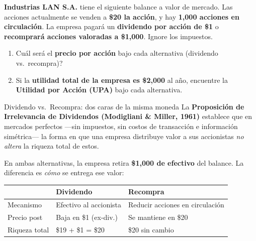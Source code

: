 \documentclass[12pt,a4paper]{article}
\begin{document}
\begin{cajaenunciado}
\textbf{Industrias LAN S.A.} tiene el siguiente balance a valor de mercado.
Las acciones actualmente se venden a \textbf{\$20 la acci\'on}, y hay
\textbf{1{,}000 acciones en circulaci\'on}. La empresa pagar\'a un
\textbf{dividendo por acci\'on de \$1} o \textbf{recomprar\'a acciones
valoradas a \$1{,}000}. Ignore los impuestos.

\begin{enumerate}[label=\alph*.]
\item \textquestiondown Cu\'al ser\'a el \textbf{precio por acci\'on} bajo cada alternativa
      (dividendo vs.\ recompra)?
\item Si la \textbf{utilidad total de la empresa es \$2{,}000} al a\~no, encuentre la
      \textbf{Utilidad por Acci\'on (UPA)} bajo cada alternativa.
\end{enumerate}
\end{cajaenunciado}

\vspace{0.5cm}

\begin{cajaintuicion}{Dividendo vs.\ Recompra: dos caras de la misma moneda}
La \textbf{Proposici\'on de Irrelevancia de Dividendos
(Modigliani \& Miller, 1961)} establece que en mercados perfectos
---sin impuestos, sin costos de transacci\'on e informaci\'on
sim\'etrica--- la forma en que una empresa distribuye valor a sus
accionistas \emph{no altera} la riqueza total de estos.

En ambas alternativas, la empresa retira \textbf{\$1{,}000 de efectivo} del balance.
La diferencia es \emph{c\'omo} se entrega ese valor:

\begin{center}
\begin{tabular}{lll}
\toprule
 & \textbf{Dividendo} & \textbf{Recompra} \\
\midrule
Mecanismo   & Efectivo al accionista & Reducir acciones en circulaci\'on \\
Precio post & Baja en \$1 (ex-div.)  & Se mantiene en \$20 \\
Riqueza total & \$19 + \$1 = \$20    & \$20 sin cambio \\
\bottomrule
\end{tabular}
\end{center}
\end{cajaintuicion}
\end{document}
